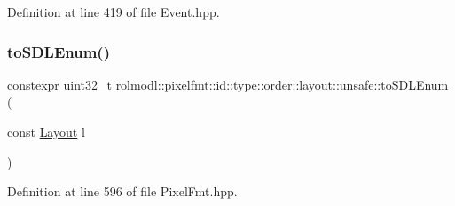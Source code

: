 Definition at line 419 of file Event.\+hpp.

\mbox{\label{namespacerolmodl_1_1pixelfmt_1_1id_1_1type_1_1order_1_1layout_1_1unsafe_aa9a521730909e8a7f08c19ad4f0b533f}} 
\subsubsection{\texorpdfstring{toSDLEnum()}{toSDLEnum()}}
{\footnotesize\ttfamily constexpr uint32\+\_\+t rolmodl\+::pixelfmt\+::id\+::type\+::order\+::layout\+::unsafe\+::to\+S\+D\+L\+Enum (\begin{DoxyParamCaption}\item[{const \mbox{\hyperlink{namespacerolmodl_1_1pixelfmt_1_1id_1_1type_1_1order_a4177275b82f1923d1a2f07e1f87f0391}{Layout}}}]{l }\end{DoxyParamCaption})\hspace{0.3cm}{\ttfamily [noexcept]}}



Definition at line 596 of file Pixel\+Fmt.\+hpp.

